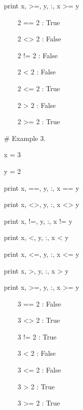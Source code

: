 \documentclass[12pt,twoside]{book}
\begin{document}
print x, {\textquotedbl}{\textgreater}={\textquotedbl}, y, {\textquotedbl}:{\textquotedbl}, x {\textgreater}= y

{\textbar}

\ \ \ \ 2 == 2 : True

\ \ \ \ 2 {\textless}{\textgreater} 2 : False

\ \ \ \ 2 != 2 : False

\ \ \ \ 2 {\textless} 2 : False

\ \ \ \ 2 {\textless}= 2 : True

\ \ \ \ 2 {\textgreater} 2 : False

\ \ \ \ 2 {\textgreater}= 2 : True


\bigskip

\# Example 3.

x = 3

y = 2 \ 


\bigskip

print x, {\textquotedbl}=={\textquotedbl}, y, {\textquotedbl}:{\textquotedbl}, x == y

print x, {\textquotedbl}{\textless}{\textgreater}{\textquotedbl}, y, {\textquotedbl}:{\textquotedbl}, x {\textless}{\textgreater} y

print x, {\textquotedbl}!={\textquotedbl}, y, {\textquotedbl}:{\textquotedbl}, x != y

print x, {\textquotedbl}{\textless}{\textquotedbl}, y, {\textquotedbl}:{\textquotedbl}, x {\textless} y

print x, {\textquotedbl}{\textless}={\textquotedbl}, y, {\textquotedbl}:{\textquotedbl}, x {\textless}= y

print x, {\textquotedbl}{\textgreater}{\textquotedbl}, y, {\textquotedbl}:{\textquotedbl}, x {\textgreater} y

print x, {\textquotedbl}{\textgreater}={\textquotedbl}, y, {\textquotedbl}:{\textquotedbl}, x {\textgreater}= y

{\textbar}

\ \ \ \ 3 == 2 : False

\ \ \ \ 3 {\textless}{\textgreater} 2 : True

\ \ \ \ 3 != 2 : True

\ \ \ \ 3 {\textless} 2 : False

\ \ \ \ 3 {\textless}= 2 : False

\ \ \ \ 3 {\textgreater} 2 : True

\ \ \ \ 3 {\textgreater}= 2 : True


\bigskip
\end{document}

